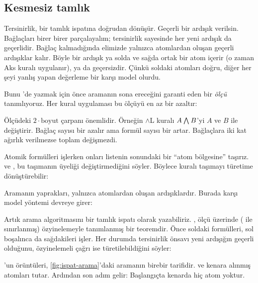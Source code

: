 \subsection{Kesmesiz tamlık}

Tersinirlik, bir tamlık ispatına doğrudan dönüşür. Geçerli bir ardışık
verilsin. Bağlaçları birer birer parçalayalım; tersinirlik sayesinde her
yeni ardışık da geçerlidir. Bağlaç kalmadığında elimizde yalnızca
atomlardan oluşan geçerli ardışıklar kalır. Böyle bir ardışık ya solda ve
sağda ortak bir atom içerir (o zaman Aks kuralı uygulanır), ya da
geçersizdir. Çünkü soldaki atomları doğru, diğer her şeyi yanlış yapan
değerleme bir karşı model olurdu.

Bunu \Lean{}'de yazmak için önce aramanın sona ereceğini garanti eden bir
\emph{ölçü} tanımlıyoruz. Her kural uygulaması bu ölçüyü en az bir
azaltır:


\noindent Ölçüdeki $2 \cdot \mathrm{boyut}$ çarpanı önemlidir. Örneğin
$\wedge$L kuralı $A \mathbin{\textstyle\bigwedge} B$'yi $A$ ve $B$ ile değiştirir. Bağlaç sayısı
bir azalır ama formül sayısı bir artar. Bağlaçlara iki kat ağırlık
verilmezse toplam değişmezdi.

Atomik formülleri işlerken onları listenin sonundaki bir ``atom
bölgesine'' taşırız.  ve , bu taşımanın üyeliği
değiştirmediğini söyler. Böylece  kuralı taşımayı türetime
dönüştürebilir:


\noindent Aramanın yaprakları, yalnızca atomlardan oluşan ardışıklardır.
Burada karşı model yöntemi devreye girer:


\noindent Artık arama algoritmasını bir tamlık ispatı olarak yazabiliriz.
, ölçü üzerinde ( ile sınırlanmış) özyinelemeyle
tanımlanmış bir teoremdir. Önce soldaki formülleri, sol boşalınca da
sağdakileri işler. Her durumda tersinirlik önsavı yeni ardışığın geçerli
olduğunu, özyinelemeli çağrı ise türetilebildiğini söyler:


\noindent {}'un örüntüleri, \cref{fig:ispat-arama}'daki
aramanın birebir tarifidir.  ve  kenara alınmış atomları
tutar. Ardından son adım gelir: Başlangıçta kenarda hiç atom yoktur.

